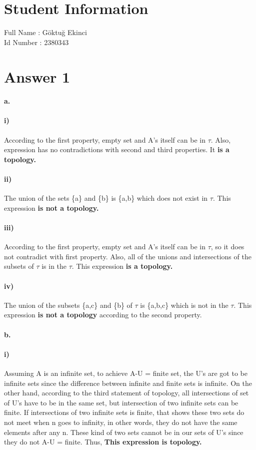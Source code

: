 \documentclass[11pt]{article}
\begin{document}
\section*{Student Information } 
Full Name : Göktuğ Ekinci \\
Id Number : 2380343 \\

\section*{Answer 1}
\paragraph{a.}
\paragraph{i)}
According to the first property, empty set and A's itself can be in $\tau$. Also, expression has no contradictions with second and third properties. It \textbf{is a topology.}
\paragraph{ii)}
The union of the sets \{a\} and \{b\} is \{a,b\} which does not exist in $\tau$. This expression \textbf{is not a topology.}
\paragraph{iii)}
According to the first property, empty set and A's itself can be in $\tau$, so it does not contradict with first property. Also, all of the unions and intersections of the subsets of $\tau$ is in the $\tau$. This expression \textbf{is a topology.}
\paragraph{iv)}
The union of the subsets \{a,c\} and \{b\} of $\tau$ is \{a,b,c\} which is not in the $\tau$. This expression \textbf{is not a topology} according to the second property.
\paragraph{b.}
\paragraph{i)}
Assuming A is an infinite set, to achieve A-U = finite set, the U's are got to be infinite sets since the difference between infinite and finite sets is infinite. On the other hand, according to the third statement of topology, all intersections of set of U's have to be in the same set, but intersection of two infinite sets can be finite. If intersections of two infinite sets is finite, that shows these two sets do not meet when n goes to infinity, in other words, they do not have the same elements after any n. These kind of two sets cannot be in our sets of U's since they do not A-U = finite. Thus, \textbf{This expression is topology.}
\end{document}
